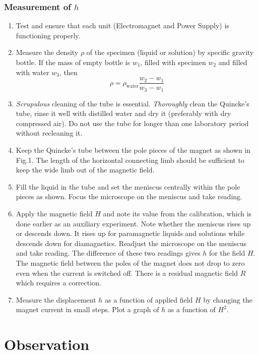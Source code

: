 \documentclass[%
 sor,
 jor,
 amsmath,amssymb,
 reprint,
]{revtex4-2}
\begin{document}
\subsubsection{Measurement of $h$}
\begin{enumerate}
    \item Test and ensure that each unit (Electromagnet and Power Supply) is functioning properly.
    \item Measure the density $\rho$ of the specimen (liquid or solution) by specific gravity bottle. If the mass of empty bottle is $w_{1}$, filled with specimen $w_{2}$ and filled with water $w_{3}$, then
    \begin{equation}
        \rho = \rho_{\text{water}} \frac{w_{2} - w_{1}}{w_{3} - w_{1}}
    \end{equation}
    \item \textit{Scrupulous} cleaning of the tube is essential. \textit{Thoroughly} clean the Quincke's tube, rinse it well with distilled water and dry it (preferably with dry compressed air). Do not use the tube for longer than one laboratory period without recleaning it.
    \item Keep the Quincke's tube between the pole pieces of the magnet as shown in Fig.1. The length of the horizontal connecting limb should be sufficient to keep the wide limb out of the magnetic field.
    \item Fill the liquid in the tube and set the meniscus centrally within the pole pieces as shown. Focus the microscope on the meniscus and take reading.
    \item Apply the magnetic field $H$ and note its value from the calibration, which is done earlier as an auxiliary experiment. Note whether the meniscus rises up or descends down. It rises up for paramagnetic liquids and solutions while descends down for diamagnetics. Readjust the microscope on the meniscus and take reading. The difference of these two readings gives $h$ for the field $H$. The magnetic field between the poles of the magnet does not drop to zero even when the current is switched off. There is a residual magnetic field $R$ which requires a correction.
    \item Measure the displacement $h$ as a function of applied field $H$ by changing the magnet current in small steps. Plot a graph of $h$ as a function of $H^{2}$.
\end{enumerate}



\section{Observation}
\end{document}
